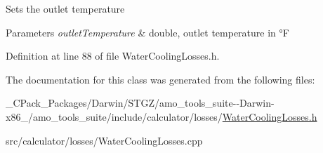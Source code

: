 Sets the outlet temperature 
\begin{DoxyParams}{Parameters}
{\em outlet\+Temperature} & double, outlet temperature in °F \\
\hline
\end{DoxyParams}


Definition at line 88 of file Water\+Cooling\+Losses.\+h.



The documentation for this class was generated from the following files\+:\begin{DoxyCompactItemize}
\item 
\+\_\+\+C\+Pack\+\_\+\+Packages/\+Darwin/\+S\+T\+G\+Z/amo\+\_\+tools\+\_\+suite-\/-\/\+Darwin-\/x86\+\_/amo\+\_\+tools\+\_\+suite/include/calculator/losses/\hyperlink{___c_pack___packages_2_darwin_2_s_t_g_z_2amo__tools__suite--_darwin-x86__64_2amo__tools__suite_2648016b82c2503c0c1f23360ff1dd754}{Water\+Cooling\+Losses.\+h}\item 
src/calculator/losses/Water\+Cooling\+Losses.\+cpp\end{DoxyCompactItemize}
